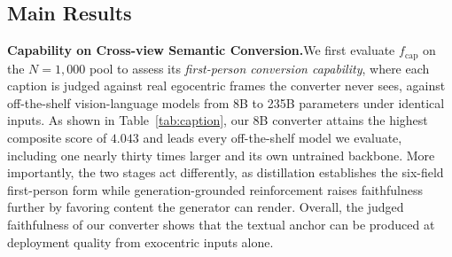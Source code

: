 \documentclass{article}
\begin{document}
\subsection{Main Results}
\label{sec:main}

\textbf{Capability on Cross-view Semantic Conversion.}\quad We first evaluate
$f_{\mathrm{cap}}$ on the $N{=}1{,}000$ pool to assess its \emph{first-person
conversion capability}, where each caption is judged against real egocentric
frames the converter never sees, against off-the-shelf vision-language models from
8B to 235B parameters under identical inputs. As shown in Table~\ref{tab:caption}, our 8B converter attains the
highest composite score of $4.043$ and leads every off-the-shelf model we
evaluate, including one nearly thirty times larger and its own untrained
backbone. More importantly, the two stages act differently, as distillation
establishes the six-field first-person form while generation-grounded
reinforcement raises faithfulness further by favoring content the generator can
render.
Overall, the judged faithfulness of our converter shows that the textual anchor
can be produced at deployment quality from exocentric inputs alone.
\end{document}
